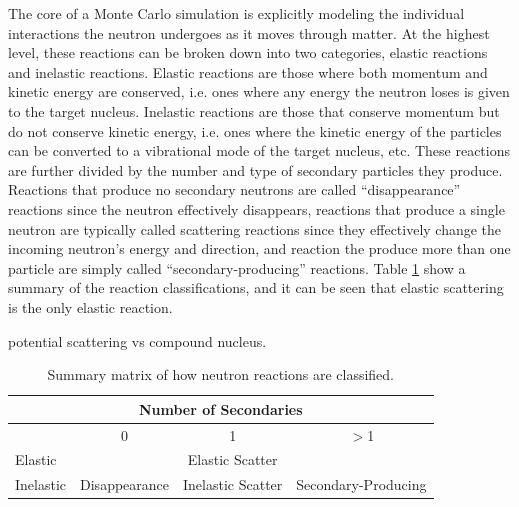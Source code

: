The core of a Monte Carlo simulation is explicitly modeling the individual interactions the neutron undergoes as it moves through matter.  At the highest level, these reactions can be broken down into two categories, elastic reactions and inelastic reactions.  Elastic reactions are those where both momentum and kinetic energy are conserved, i.e. ones where any energy the neutron loses is given to the target nucleus.  Inelastic reactions are those that conserve momentum but do not conserve kinetic energy, i.e. ones where the kinetic energy of the particles can be converted to a vibrational mode of the target nucleus, etc.  These reactions are further divided by the number and type of secondary particles they produce.  Reactions that produce no secondary neutrons are called ``disappearance'' reactions since the neutron effectively disappears, reactions that produce a single neutron are typically called scattering reactions since they effectively change the incoming neutron's energy and direction, and reaction the produce more than one particle are simply called ``secondary-producing'' reactions. Table \ref{nuc_reaction_summary} show a summary of the reaction classifications, and it can be seen that elastic scattering is the only elastic reaction.   

potential scattering vs compound nucleus.

\begin{table}[h]
\centering
\caption{Summary matrix of how neutron reactions are classified.}
\label{nuc_reaction_summary}
\begin{tabular}{| l | c | c | c |}
\multicolumn{4}{c}{Number of Secondaries} \\
\hline
  & 0 & 1 & $>$1 \\
 \hline
 Elastic & & Elastic Scatter & \\
 \hline
 Inelastic & Disappearance & Inelastic Scatter & Secondary-Producing \\
\hline
\end{tabular}
\end{table}

